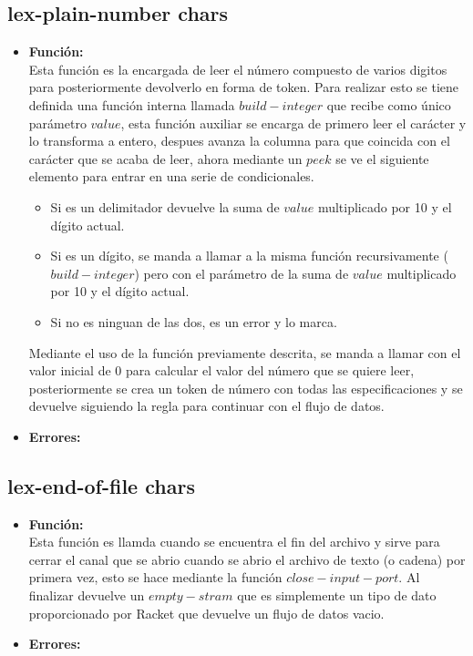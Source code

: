 \documentclass{article}
\begin{document}
\subsection{lex-plain-number chars}
\begin{itemize}
    \item \textbf{Función:} \\
    Esta función es la encargada de leer el número compuesto de varios digitos para posteriormente devolverlo en forma de token. Para realizar esto se tiene definida una función interna llamada $build-integer$ que recibe como único parámetro $value$, esta función auxiliar se encarga de primero leer el carácter y lo transforma a entero, despues avanza la columna para que coincida con el carácter que se acaba de leer, ahora mediante un $peek$ se ve el siguiente elemento para entrar en una serie de condicionales.\\
    \begin{itemize}
        \item Si es un delimitador devuelve la suma de $value$ multiplicado por 10 y el dígito actual.\\
        \item Si es un dígito, se manda a llamar a la misma función recursivamente ($build-integer$) pero con el parámetro de la suma de $value$ multiplicado por 10 y el dígito actual.\\
        \item Si no es ninguan de las dos, es un error y lo marca.\\
    \end{itemize}
    Mediante el uso de la función previamente descrita, se manda a llamar con el valor inicial de 0 para calcular el valor del número que se quiere leer, posteriormente se crea un token de número con todas las especificaciones y se devuelve siguiendo la regla para continuar con el flujo de datos.
    \item \textbf{Errores:} \\ 
\end{itemize}
\subsection{lex-end-of-file chars}
\begin{itemize}
    \item \textbf{Función:} \\
    Esta función es llamda cuando se encuentra el fin del archivo y sirve para cerrar el canal que se abrio cuando se abrio el archivo de texto (o cadena) por primera vez, esto se hace mediante la función $close-input-port$. Al finalizar devuelve un $empty-stram$ que es simplemente un tipo de dato proporcionado por Racket que devuelve un flujo de datos vacio.
    \item \textbf{Errores:} \\ 
\end{itemize}
\end{document}
